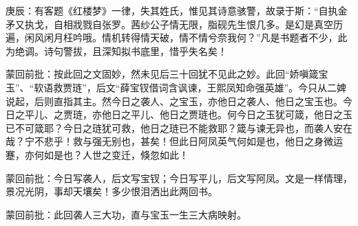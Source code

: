 
\begin{parag}
    \begin{note}庚辰：有客题《红楼梦》一律，失其姓氏，惟见其诗意骇警，故录于斯：“自执金矛又执戈，自相戕戮自张罗。茜纱公子情无限，脂砚先生恨几多。是幻是真空历遍，闲风闲月枉吟哦。情机转得情天破，情不情兮奈我何？”凡是书题者不少，此为绝调。诗句警拔，且深知拟书底里，惜乎失名矣！\end{note}
\end{parag}


\begin{parag}
    \begin{note}蒙回前批：按此回之文固妙，然未见后三十回犹不见此之妙。此回“娇嗔箴宝玉”、“软语救贾琏”，后文“薛宝钗借词含讽谏，王熙凤知命强英雄”。今只从二婢说起，后则直指其主。然今日之袭人、之宝玉，亦他日之袭人、他日之宝玉也。今日之平儿、之贾琏，亦他日之平儿、他日之贾琏也。何今日之玉犹可箴，他日之玉已不可箴耶？今日之琏犹可救，他日之琏已不能救耶？箴与谏无异也，而袭人安在哉？宁不悲乎！救与强无别也，甚矣！但此日阿凤英气何如是也，他日之身微运蹇，亦何如是也？人世之变迁，倏忽如此！\end{note}
\end{parag}


\begin{parag}
    \begin{note}蒙回前批：今日写袭人，后文写宝钗；今日写平儿，后文写阿凤。文是一样情理，景况光阴，事却天壤矣！多少恨泪洒出此两回书。\end{note}
\end{parag}


\begin{parag}
    \begin{note}蒙回前批：此回袭人三大功，直与宝玉一生三大病映射。\end{note}
\end{parag}


